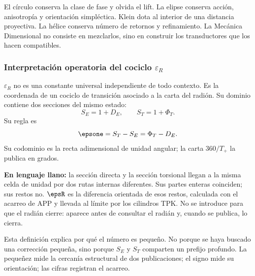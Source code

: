 El círculo conserva la clase de fase y olvida el lift. La elipse conserva
acción, anisotropía y orientación simpléctica. Klein dota al interior de una
distancia proyectiva. La hélice conserva número de retornos y refinamiento.
La Mecánica Dimensional no consiste en mezclarlos, sino en construir los
transductores que los hacen compatibles.

\subsubsection{Interpretación operatoria del cociclo \(\varepsilon_R\)}

\(\varepsilon_R\) no es una constante universal independiente de todo contexto. Es la
coordenada de un cociclo de transición asociado a la carta del radión. Su
dominio contiene dos secciones del mismo estado:
\[
S_E=1+D_E,
\qquad
S_T=1+\Phi_T.
\]
Su regla es
\begin{equation}
\epsone=S_T-S_E=\Phi_T-D_E.
\label{eq:epsilon-final-meaning}
\end{equation}
Su codominio es la recta adimensional de unidad angular; la carta
\(360/T_+\) la publica en grados.

\begin{exactbox}
\textbf{En lenguaje llano:} la sección directa y la sección torsional llegan
a la misma celda de unidad por dos rutas internas diferentes. Sus partes
enteras coinciden; sus restos no. \(\epsR\) es la diferencia orientada de esos
restos, calculada con el acarreo de APP y llevada al límite por los cilindros
TPK. No se introduce para que el radián cierre: aparece antes de consultar el
radián y, cuando se publica, lo cierra.
\end{exactbox}

Esta definición explica por qué el número es pequeño. No porque se haya
buscado una corrección pequeña, sino porque \(S_E\) y \(S_T\) comparten un
prefijo profundo. La pequeñez mide la cercanía estructural de dos
publicaciones; el signo mide su orientación; las cifras registran el acarreo.

